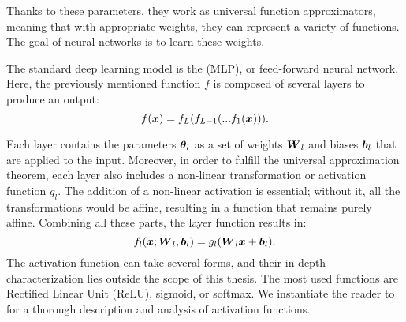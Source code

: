 Thanks to these parameters, they work as universal function approximators, meaning that with appropriate weights, they can represent a variety of functions. The goal of neural networks is to learn these weights.

The standard deep learning model is the  (MLP), or feed-forward neural network. Here, the previously mentioned function $f$ is composed of several layers to produce an output:
\begin{equation*}
    f(\boldsymbol{x}) = f_L(f_{L-1}(...f_1(\boldsymbol{x}))).
\end{equation*}

Each layer contains the parameters $\boldsymbol{\theta}_l$ as a set of weights $\boldsymbol{W}_l$ and biases $\boldsymbol{b}_l$ that are applied to the input. Moreover, in order to fulfill the universal approximation theorem, each layer also includes a non-linear transformation or activation function $g_l$. The addition of a non-linear activation is essential; without it, all the transformations would be affine, resulting in a function that remains purely affine. Combining all these parts, the layer function results in:
\begin{equation*}
    f_l(\boldsymbol{x};\boldsymbol{W}_l,\boldsymbol{b}_l) = {g_l}(\boldsymbol{W}_l\boldsymbol{x} + \boldsymbol{b}_l).
\end{equation*}
The activation function can take several forms, and their in-depth characterization lies outside the scope of this thesis. The most used functions are Rectified Linear Unit (ReLU), sigmoid, or softmax. We instantiate the reader to  for a thorough description and analysis of activation functions.


